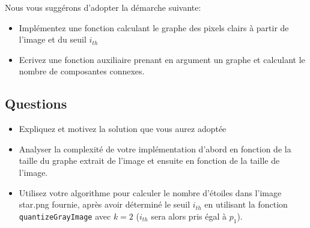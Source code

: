 \documentclass[a4paper,10pt]{article}
\begin{document}
Nous vous suggérons d'adopter la démarche suivante:
\begin{itemize}
\item Implémentez une fonction calculant le graphe des pixels clairs à partir de l'image et du seuil $i_{th}$
\item Ecrivez une fonction auxiliaire prenant en argument un graphe et calculant le nombre de composantes connexes.
\end{itemize}

\subsection*{Questions}

\begin{itemize}
\item Expliquez et motivez la solution que vous aurez adoptée
\item Analyser la complexité de votre implémentation d'abord en fonction de la
  taille du graphe extrait de l'image et ensuite en fonction de la taille de
  l'image.
\item Utilisez votre algorithme pour calculer le nombre d'étoiles dans
  l'image star.png fournie, après avoir déterminé le seuil $i_{th}$ en utilisant la fonction \texttt{quantizeGrayImage} avec $k=2$ ($i_{th}$ sera alors pris égal à $p_1$).
\end{itemize}
\end{document}
